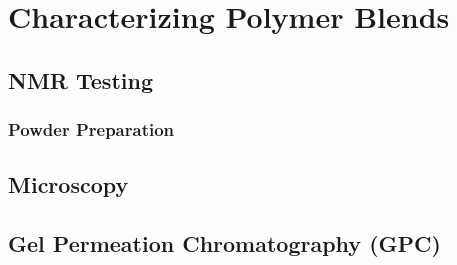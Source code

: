 \section{Characterizing Polymer Blends\label{sec:literatureReview:characterization}}

\subsection{NMR Testing\label{sec:literatureReview:characterization:NMR}}

\subsubsection{Powder Preparation\label{sec:literatureReview:characterization:NMR:powderPrep}}

\subsection{Microscopy\label{sec:literatureReview:characterization:microscopy}}

\subsection{Gel Permeation Chromatography (GPC)\label{sec:literatureReview:characterization:GPC}}
